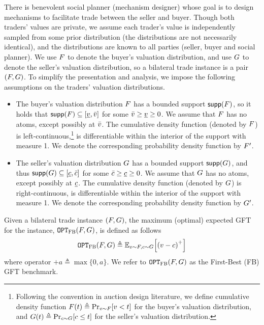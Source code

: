  There is benevolent social planner (mechanism designer) whose goal is to design mechanisms to facilitate trade between the seller and buyer. Though both traders' values are private, we assume each trader's value is independently sampled from some prior distribution (the distributions are not necessarily identical), and the distributions are known to all parties (seller, buyer and social planner). We use $F$ to denote the buyer's valuation distribution, and use $G$ to denote the seller's valuation distribution, so a bilateral trade instance is a pair $(F,G)$. To simplify the presentation and analysis, we impose the following assumptions on the traders' valuation distributions.
\begin{itemize}
    \item 
    The buyer's valuation distribution $F$ has a bounded support ${\sf supp}(F)$, 
    so it holds that ${{\sf supp}(F)} \subseteq [\underline{v}, \bar{v}]$ for some $\bar{v}\geq \underline{v}\geq 0$.    
    We assume that $F$ has no atoms, except possibly at $\bar{v}$. 
    The cumulative density function (denoted by $F$) is left-continuous,\footnote{Following the convention in auction design literature, we define cumulative density function $\buyercdf(t)\triangleq \prob[\val\sim\buyercdf]{\val < t}$ for the buyer's valuation distribution, and $\sellercdf(t) \triangleq \prob[\cost\sim\sellerdist]{\cost \leq t}$ for the seller's valuation distribution.} is differentiable within the interior of the support with measure 1. We denote the corresponding probability density function by $F'$.
    
    \item The seller's valuation distribution $G$ has a bounded support ${\sf supp}(G)$, 
    and thus ${{\sf supp}(G)} \subseteq [\underline{c}, \bar{c}]$ for some $\bar{c}\geq \underline{c}\geq 0$.    
    We assume that $G$ has no atoms, except possibly at $\underline{c}$. 
    The cumulative density function (denoted by $G$) is right-continuous, is differentiable within the interior of the support with measure 1. We denote the corresponding probability density function by $G'$.
\end{itemize}
Given a bilateral trade instance $(F,G)$, the maximum (optimal) expected GFT for the instance, 
$\texttt{OPT}_{\textsc{FB}}(F,G)$, is defined as follows  
\begin{align*}
    \OPTFB\btinstance \triangleq \expect[\val\sim\buyerdist,\cost\sim\sellerdist]{\plus{\val - \cost}}
\end{align*}
where operator $\plus{a} \triangleq \max\{0, a\}$.
We refer to $\texttt{OPT}_{\textsc{FB}}(F,G)$ as the {\sf First-Best (FB) GFT benchmark}.

